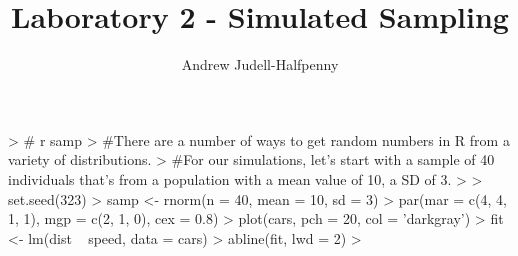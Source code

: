 \documentclass{article}
\begin{document}

\title{Laboratory 2 - Simulated Sampling}
\author{Andrew Judell-Halfpenny}
\maketitle


\begin{Schunk}
\end{Schunk}


\begin{Schunk}
\begin{Sinput}
> # r samp
> #There are a number of ways to get random numbers in R from a variety of distributions.
> #For our simulations, let's start with a sample of 40 individuals that's from a population with a mean value of 10, a SD of 3.
> 
> set.seed(323)
> samp <- rnorm(n = 40, mean = 10, sd = 3)
> par(mar = c(4, 4, 1, 1), mgp = c(2, 1, 0), cex = 0.8)
> plot(cars, pch = 20, col = 'darkgray')
> fit <- lm(dist ~ speed, data = cars)
> abline(fit, lwd = 2)
> 
\end{Sinput}
\end{Schunk}
\end{document}
